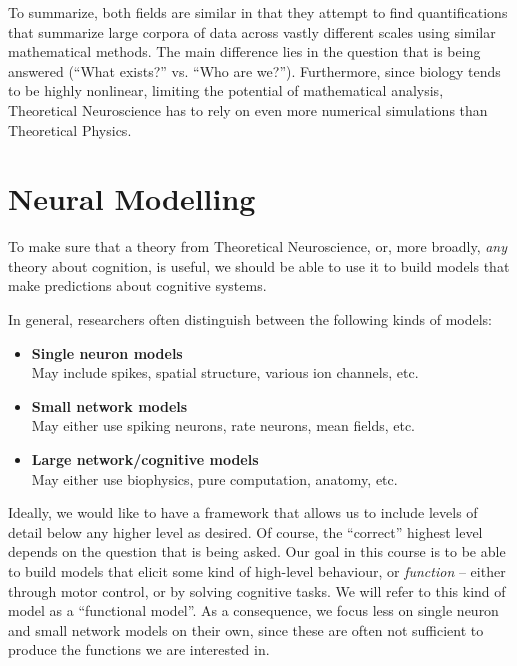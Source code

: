 \documentclass[10pt,letterpaper,oneside]{article}
\begin{document}
To summarize, both fields are similar in that they attempt to find quantifications that summarize large corpora of data across vastly different scales using similar mathematical methods. The main difference lies in the question that is being answered (\enquote{What exists?} vs. \enquote{Who are we?}). Furthermore, since biology tends to be highly nonlinear, limiting the potential of mathematical analysis, Theoretical Neuroscience has to rely on even more numerical simulations than Theoretical Physics.

\section{Neural Modelling}

To make sure that a theory from Theoretical Neuroscience, or, more broadly, \emph{any} theory about cognition, is useful, we should be able to use it to build models that make predictions about cognitive systems.


In general, researchers often distinguish between the following kinds of models:
\begin{itemize}
	\item \textbf{Single neuron models}\\
	May include spikes, spatial structure, various ion channels, etc.
	\item \textbf{Small network models}\\
	May either use spiking neurons, rate neurons, mean fields, etc.
	\item \textbf{Large network/cognitive models}\\
	May either use biophysics, pure computation, anatomy, etc.
\end{itemize}
Ideally, we would like to have a framework that allows us to include levels of detail below any higher level as desired. Of course, the \enquote{correct} highest level depends on the question that is being asked. Our goal in this course is to be able to build models that elicit some kind of high-level behaviour, or \emph{function} -- either through motor control, or by solving cognitive tasks. We will refer to this kind of model as a \enquote{functional model}. As a consequence, we focus less on single neuron and small network models on their own, since these are often not sufficient to produce the functions we are interested in.
\end{document}
